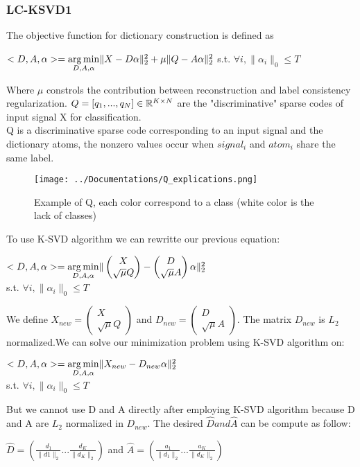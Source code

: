 \subsubsection{LC-KSVD1}
The objective function for dictionary construction is  defined as
\begin{center}
 $<D,A,\alpha> = \underset{D,A,\alpha}{\operatorname*{arg\,min}} \| X - D\alpha \|^2_2 + \mu \|Q -A\alpha\|^2_2$  s.t. $\forall i, \|\alpha_i\|_0 \leq T$
\end{center}

Where $\mu$ constrols the contribution between reconstruction and label consistency regularization. $Q = [q_1,...,q_N] \in \mathbb{R}^{K \times N}$ are the "discriminative" sparse codes of input signal X for classification.\\
Q is a discriminative sparse code corresponding to an input signal and the dictionary atoms, the nonzero values occur when $signal_i$ and $atom_i$ share the same label.
\begin{figure}[h]
 \centering
 \texttt{[image: ../Documentations/Q\_explications.png]}
 \caption{Example of Q, each color correspond to a class (white color  is the lack of classes)}
\end{figure}
To use K-SVD algorithm we can rewritte our previous equation:
\begin{center}
$ <D,A,\alpha> = \underset{D,A,\alpha}{\operatorname*{arg\,min}} \| \begin{pmatrix} 
X  \\
\sqrt{\mu}Q
\end{pmatrix} -  \begin{pmatrix} 
D  \\
\sqrt{\mu}A
\end{pmatrix}\alpha \|^2_2 $  \\ \vspace{0.5cm} s.t. $\forall i, \|\alpha_i\|_0 \leq T $
\end{center}
We define $X_{new}  =  \begin{pmatrix} 
X  \\
\sqrt{\mu}Q
\end{pmatrix}$ and $D_{new} =  \begin{pmatrix} 
D  \\
\sqrt{\mu}A
\end{pmatrix}$. The matrix $D_{new}$ is $L_2$ normalized.We can solve our minimization problem using K-SVD algorithm on:
\begin{center}
 $<D,A,\alpha> = \underset{D,A,\alpha}{\operatorname*{arg\,min}} \| X_{new} - D_{new}\alpha \|^2_2$ \\  \vspace{0.5cm}s.t. $\forall i, \|\alpha_i\|_0 \leq T$
\end{center}
But  we cannot use D and A  directly after employing K-SVD algorithm because D and A are $L_2$ normalized in $D_{new}$. The desired $\hat{D} and \hat{A}$ can be compute as follow:\vspace{0.5cm}\begin{center}
$\hat{D} = (
\frac{d_1}{\|d1\|_2}  ...  \frac{d_K}{\|d_K\|_2} 
)$   and $\hat{A} =
(\frac{a_1}{\|d_1\|_2}  ...  \frac{a_K}{\|d_K\|_2} 
)$
\end{center}


